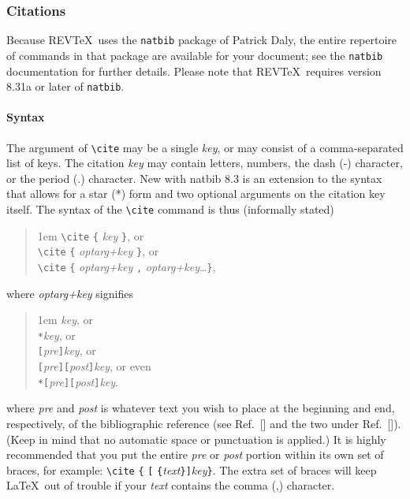 \documentclass[%
 reprint,
 amsmath,amssymb,
 aps,
]{revtex4-1}
\begin{document}
\subsubsection{Citations}
Because REV\TeX\ uses the \verb+natbib+ package of Patrick Daly, 
the entire repertoire of commands in that package are available for your document;
see the \verb+natbib+ documentation for further details. Please note that
REV\TeX\ requires version 8.31a or later of \verb+natbib+.

\paragraph{Syntax}
The argument of \verb+\cite+ may be a single \emph{key}, 
or may consist of a comma-separated list of keys.
The citation \emph{key} may contain 
letters, numbers, the dash (-) character, or the period (.) character. 
New with natbib 8.3 is an extension to the syntax that allows for 
a star (*) form and two optional arguments on the citation key itself.
The syntax of the \verb+\cite+ command is thus (informally stated)
\begin{quotation}\flushleft\leftskip1em
\verb+\cite+ \verb+{+ \emph{key} \verb+}+, or\\
\verb+\cite+ \verb+{+ \emph{optarg+key} \verb+}+, or\\
\verb+\cite+ \verb+{+ \emph{optarg+key} \verb+,+ \emph{optarg+key}\ldots \verb+}+,
\end{quotation}\noindent
where \emph{optarg+key} signifies 
\begin{quotation}\flushleft\leftskip1em
\emph{key}, or\\
\texttt{*}\emph{key}, or\\
\texttt{[}\emph{pre}\texttt{]}\emph{key}, or\\
\texttt{[}\emph{pre}\texttt{]}\texttt{[}\emph{post}\texttt{]}\emph{key}, or even\\
\texttt{*}\texttt{[}\emph{pre}\texttt{]}\texttt{[}\emph{post}\texttt{]}\emph{key}.
\end{quotation}\noindent
where \emph{pre} and \emph{post} is whatever text you wish to place 
at the beginning and end, respectively, of the bibliographic reference
(see Ref.~[] and the two under Ref.~[]).
(Keep in mind that no automatic space or punctuation is applied.)
It is highly recommended that you put the entire \emph{pre} or \emph{post} portion 
within its own set of braces, for example: 
\verb+\cite+ \verb+{+ \texttt{[} \verb+{+\emph{text}\verb+}+\texttt{]}\emph{key}\verb+}+.
The extra set of braces will keep \LaTeX\ out of trouble if your \emph{text} contains the comma (,) character.
\end{document}
